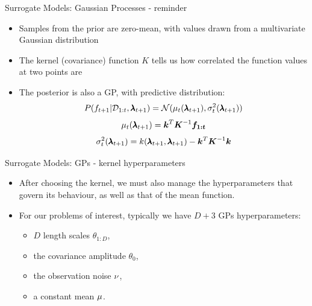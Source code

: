 \begin{frame}[c]{Surrogate Models: Gaussian Processes - reminder}

\begin{itemize}
    \item<1-3> Samples from the prior are zero-mean, with values drawn from a multivariate Gaussian distribution
    \item<2-3> The kernel (covariance) function $K$ tells us how correlated the function values at two points are
    \item<3-3> The posterior is also a GP, with predictive distribution:
    \begin{equation*}
         P(f_{t+1} \vert \mathcal{D}_{1:t}, \pmb{\lambda}_{t+1}) =  \mathcal{N}(\mu_{t}(\pmb{\lambda}_{t+1}), \sigma^2_{t}(\pmb{\lambda}_{t+1}))
    \end{equation*}
    \begin{equation*}
        \mu_{t}(\pmb{\lambda}_{t+1}) = \bm{k}^{T} \bm{K}^{-1} \bm{f_{1:t}}
    \end{equation*}
    \begin{equation*}
        \sigma^2_{t}(\pmb{\lambda}_{t+1}) = k(\pmb{\lambda}_{t+1}, \pmb{\lambda}_{t+1}) - \bm{k}^{T} \bm{K}^{-1} \bm{k}
    \end{equation*}
\end{itemize}



\end{frame}
 
\begin{frame}[c]{Surrogate Models: GPs - kernel hyperparameters}

\begin{itemize}
    \item After choosing the kernel, we must also manage the hyperparameters that govern its behaviour, as well as that of the mean function.  \pause
    \item For our problems of interest, typically we have $D + 3$ GPs hyperparameters:  \pause
    \begin{itemize}
        \item $D$ length scales $\theta_{1:D}$, \pause
        \item the covariance amplitude $\theta_{0}$, \pause
        \item the observation noise $\nu$, \pause
        \item a constant mean $\mu$. 
    \end{itemize}
\end{itemize}

\end{frame}

